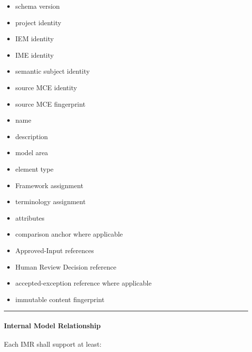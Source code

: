 \begin{itemize}
\tightlist
\item
  schema version
\item
  project identity
\item
  IEM identity
\item
  IME identity
\item
  semantic subject identity
\item
  source MCE identity
\item
  source MCE fingerprint
\item
  name
\item
  description
\item
  model area
\item
  element type
\item
  Framework assignment
\item
  terminology assignment
\item
  attributes
\item
  comparison anchor where applicable
\item
  Approved-Input references
\item
  Human Review Decision reference
\item
  accepted-exception reference where applicable
\item
  immutable content fingerprint
\end{itemize}

\begin{center}\rule{0.5\linewidth}{0.5pt}\end{center}

\hypertarget{internal-model-relationship}{%
\paragraph{Internal Model Relationship}\label{internal-model-relationship}}

Each IMR shall support at least:

